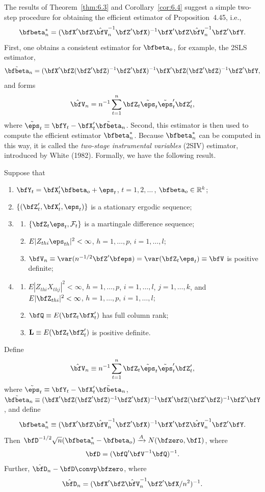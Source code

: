 The results of Theorem~\ref{thm:6.3} and Corollary~\ref{cor:6.4} suggest a simple two-step procedure for obtaining the efficient estimator of Proposition~4.45, i.e.,
\[
  \bfbeta_n^* = (\bfX'\bfZ\hat{\bfV}_n^{-1}\bfZ'\bfX)^{-1}\bfX'\bfZ\hat{\bfV}_n^{-1}\bfZ'\bfY.
\]
First, one obtains a consistent estimator for $\bfbeta_o$, for example, the 2SLS estimator,
\[
  \tilde{\bfbeta}_n = (\bfX'\bfZ(\bfZ'\bfZ)^{-1}\bfZ'\bfX)^{-1}\bfX'\bfZ(\bfZ'\bfZ)^{-1}\bfZ'\bfY,
\]
and forms
\[
  \hat{\bfV}_n = n^{-1}\sum_{t=1}^{n}\bfZ_t\tilde{\eps}_t\tilde{\eps}_t'\bfZ_t',
\]
where $\tilde{\eps}_t \equiv \bfY_t - \bfX_t'\tilde{\bfbeta}_n$. Second, this estimator is then used to compute the efficient estimator $\bfbeta_n^*$. Because $\bfbeta_n^*$ can be computed in this way, it is called the \emph{two-stage instrumental variables} (2SIV) estimator, introduced by White (1982). Formally, we have the following result.

\begin{corollary}\label{cor:6.5}
Suppose that
\begin{enumerate}[label=(\roman*)]
  \item $\bfY_t = \bfX_t'\bfbeta_o + \eps_t$, \quad $t = 1,2,\ldots$\,, \quad $\bfbeta_o \in \mathbb{R}^k$;
  \item $\{(\bfZ_t',\bfX_t',\eps_t)\}$ is a stationary ergodic sequence;
  \item\begin{enumerate}[label=(\alph*)]
    \item $\{\bfZ_t\eps_t,\mathcal{F}_t\}$ is a martingale difference sequence;
    \item $E|Z_{thi}\eps_{th}|^2 < \infty$, $h = 1,\ldots,p$, $i = 1,\ldots,l$;
    \item $\bfV_n \equiv \var(n^{-1/2}\bfZ'\bfeps) = \var(\bfZ_t\eps_t) \equiv \bfV$ is positive definite;
  \end{enumerate}
  \item\begin{enumerate}[label=(\alph*)]
    \item $E|Z_{thi}X_{thj}|^2 < \infty$, $h = 1,\ldots,p$, $i = 1,\ldots,l$, $j = 1,\ldots,k$, and $E|\bfZ_{thi}|^2 < \infty$, $h = 1,\ldots,p$, $i = 1,\ldots,l$;
    \item $\bfQ \equiv E(\bfZ_t\bfX_t')$ has full column rank;
    \item $\mathbf{L} \equiv E(\bfZ_t\bfZ_t')$ is positive definite.
  \end{enumerate}
\end{enumerate}
Define
\[
  \hat{\bfV}_n \equiv n^{-1}\sum_{t=1}^{n}\bfZ_t\tilde{\eps}_t\tilde{\eps}_t'\bfZ_t',
\]
where $\tilde{\eps}_t \equiv \bfY_t - \bfX_t'\tilde{\bfbeta}_n$, $\tilde{\bfbeta}_n \equiv (\bfX'\bfZ(\bfZ'\bfZ)^{-1}\bfZ'\bfX)^{-1}\bfX'\bfZ(\bfZ'\bfZ)^{-1}\bfZ'\bfY$, and define
\[
  \bfbeta_n^* \equiv (\bfX'\bfZ\hat{\bfV}_n^{-1}\bfZ'\bfX)^{-1}\bfX'\bfZ\hat{\bfV}_n^{-1}\bfZ'\bfY.
\]
Then $\bfD^{-1/2}\sqrt{n}(\bfbeta_n^* - \bfbeta_o) \xrightarrow{A} N(\bfzero,\bfI)$, where
\[
  \bfD = (\bfQ'\bfV^{-1}\bfQ)^{-1}.
\]
Further, $\hat{\bfD}_n - \bfD \convp \bfzero$, where
\[
  \hat{\bfD}_n = (\bfX'\bfZ\hat{\bfV}_n^{-1}\bfZ'\bfX/n^2)^{-1}.
\]
\end{corollary}

